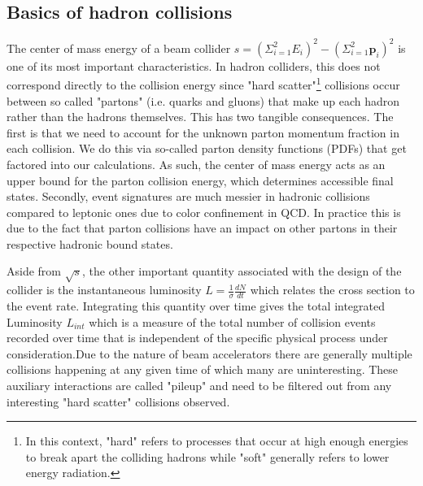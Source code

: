 \subsection{Basics of hadron collisions}

The center of mass energy of a beam collider $s = (\Sigma^2_{i=1}E_i)^2 - (\Sigma^2_{i=1}\mathbf{p}_i)^2$ is 
one of its most important characteristics. In hadron colliders, this does not correspond directly to the collision 
energy since "hard scatter"\footnote{In this context, "hard" refers to processes that occur at high enough energies 
to break apart the colliding hadrons while "soft" generally refers to lower energy radiation.} collisions occur between 
so called "partons" (i.e. quarks and gluons) that make up each hadron rather than the hadrons themselves. This has 
two tangible consequences. The first is that we need to account for the unknown parton momentum fraction in 
each collision. We do this via so-called parton density functions (PDFs) that get factored into our calculations. As 
such, the center of mass energy acts as an upper bound for the parton collision energy, which determines 
accessible final states. Secondly, event signatures are much messier in hadronic collisions compared to leptonic 
ones due to color confinement in QCD. In practice this is due to the fact that parton collisions have an impact on 
other partons in their respective hadronic bound states. \par

Aside from $\sqrt{s}$, the other important quantity associated with the design of the 
collider is the instantaneous luminosity $L = \frac{1}{\sigma}\frac{dN}{dt}$ which relates the cross section to 
the event rate. Integrating this quantity over time gives the total integrated Luminosity $L_{int}$ which is a 
measure of the total number of collision events recorded over time that is independent of the specific 
physical process under consideration.Due to the nature of beam accelerators there are generally multiple 
collisions happening at any given time of which many are uninteresting. These auxiliary interactions are called 
"pileup" and need to be filtered out from any interesting "hard scatter" collisions observed. \par


